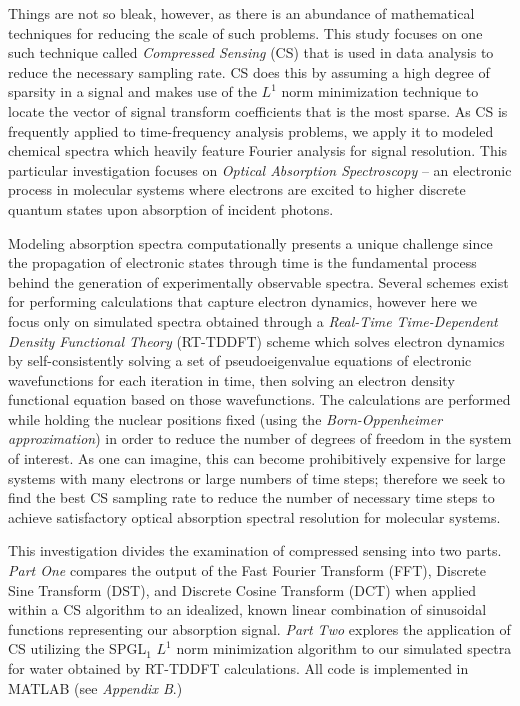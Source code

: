 \documentclass[11pt]{article}
\begin{document}
\par Things are not so bleak, however, as there is an abundance of mathematical techniques for reducing the scale of such problems. This study focuses on one such technique called \emph{Compressed Sensing} (CS) that is used in data analysis to reduce the necessary sampling rate. CS does this by assuming a high degree of sparsity in a signal and makes use of the $L^{1}$ norm minimization technique to locate the vector of signal transform coefficients that is the most sparse.  As CS is frequently applied to time-frequency analysis problems, we apply it to modeled chemical spectra which heavily feature Fourier analysis for signal resolution.  This particular investigation focuses on \emph{Optical Absorption Spectroscopy} -- an electronic process in molecular systems where electrons are excited to higher discrete quantum states upon absorption of incident photons. \\ 
 
\par Modeling absorption spectra computationally presents a unique challenge since the propagation of electronic states through time is the fundamental process behind the generation of experimentally observable spectra.  Several schemes exist for performing calculations that capture electron dynamics, however here we focus only on simulated spectra obtained through a \emph{Real-Time Time-Dependent Density Functional Theory} (RT-TDDFT) scheme which solves electron dynamics by self-consistently solving a set of pseudoeigenvalue equations of electronic wavefunctions for each iteration in time, then solving an electron density functional equation based on those wavefunctions.  The calculations are performed while holding the nuclear positions fixed (using the \emph{Born-Oppenheimer approximation}) in order to reduce the number of degrees of freedom in the system of interest.  As one can imagine, this can become prohibitively expensive for large systems with many electrons or large numbers of time steps; therefore we seek to find the best CS sampling rate to reduce the number of necessary time steps to achieve satisfactory optical absorption spectral resolution for molecular systems. \\

\par This investigation divides the examination of compressed sensing into two parts.  \emph{Part One} compares the output of the Fast Fourier Transform (FFT), Discrete Sine Transform (DST), and Discrete Cosine Transform (DCT) when applied within a CS algorithm to an idealized, known linear combination of sinusoidal functions representing our absorption signal.  \emph{Part Two} explores the application of CS utilizing the SPGL$_{1}$ $L^{1}$ norm minimization algorithm to our simulated spectra for water obtained by RT-TDDFT calculations.  All code is implemented in MATLAB (see \emph{Appendix B}.)
\end{document}
